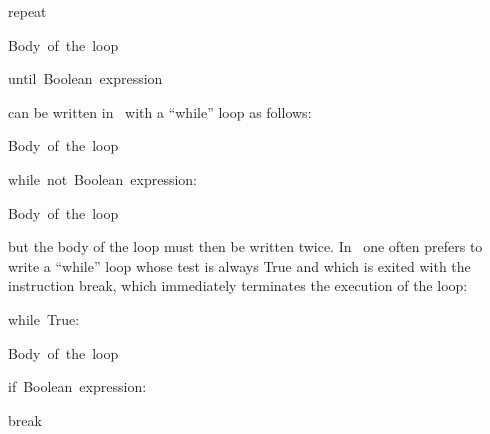 {\begin{minipage}{\myparboxwidth}
{\pagebreak[3]
\mbox{\blc  \blk\mcl repeat}\par
\mbox{\blc  \blk\blk\small\rm Body of the loop}\par
\mbox{\blc  \blk\mcl until {\small\rm Boolean expression}}\par

\medskip }

\noindent can be written in \python\ with a ``while'' loop as follows:
{
\parindent {}
\medskip

\mbox{\blc  \blk\small\rm Body of the loop}\par
\mbox{\blc  \blk\mcl while\ not\ \small\rm Boolean expression\idt :}\par
\mbox{\blc  \blk\blk\small\rm Body of the loop}\par

\medskip }

\noindent but the body of the loop must then be written twice. In \python\ one often
prefers to write a ``while'' loop whose test is always
{\mcl True} and which is exited with the instruction {\mcl break},
which immediately terminates the execution of the loop:
{
\parindent {}
\medskip

\mbox{\blc  \blk\mcl while\ True\idt :}\par
\mbox{\blc  \blk\blk\small\rm Body of the loop}\par
\mbox{\blc  \blk\blk\mcl if\ \small\rm Boolean expression\idt :}\par
\mbox{\blc  \blk\blk\blk\mcl break}\par

\medskip }

\vspace{\abovedisplayskip}
\end{minipage}
}

